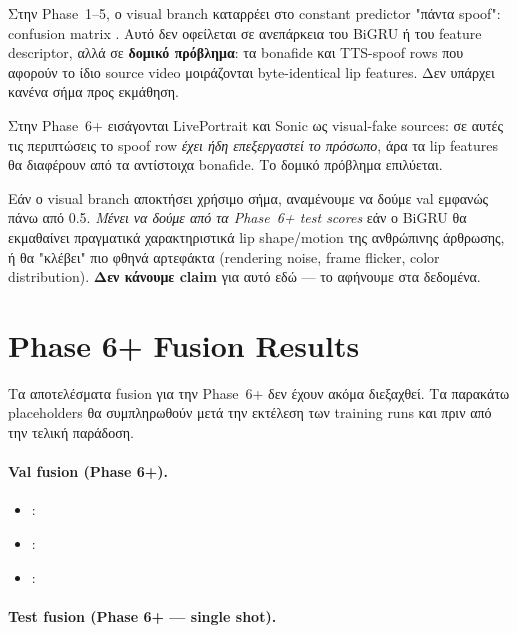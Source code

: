 Στην Phase~1–5, ο visual branch καταρρέει
στο constant predictor "πάντα spoof":
confusion matrix .
Αυτό δεν οφείλεται σε ανεπάρκεια του BiGRU ή του feature descriptor,
αλλά σε \textbf{δομικό πρόβλημα}:
τα bonafide και TTS-spoof rows που αφορούν το ίδιο source video
μοιράζονται byte-identical  lip features.
Δεν υπάρχει κανένα σήμα προς εκμάθηση.

Στην Phase~6+ εισάγονται LivePortrait και Sonic
ως visual-fake sources:
σε αυτές τις περιπτώσεις το spoof row \emph{έχει ήδη επεξεργαστεί το πρόσωπο},
άρα τα lip features θα διαφέρουν από τα αντίστοιχα bonafide.
Το δομικό πρόβλημα επιλύεται.

Εάν ο visual branch αποκτήσει χρήσιμο σήμα,
αναμένουμε να δούμε val \AUC{} εμφανώς πάνω από 0.5.
\emph{Μένει να δούμε από τα Phase~6+ test scores}
εάν ο BiGRU θα εκμαθαίνει πραγματικά χαρακτηριστικά
lip shape/motion της ανθρώπινης άρθρωσης,
ή θα "κλέβει" πιο φθηνά αρτεφάκτα
(rendering noise, frame flicker, color distribution).
\textbf{Δεν κάνουμε claim} για αυτό εδώ —
το αφήνουμε στα δεδομένα.

\section{Phase 6+ Fusion Results}
\label{sec:phase6-fusion-results}

Τα αποτελέσματα fusion για την Phase~6+
δεν έχουν ακόμα διεξαχθεί.
Τα παρακάτω placeholders θα συμπληρωθούν
μετά την εκτέλεση των training runs
και πριν από την τελική παράδοση.

\paragraph{Val \AUC{} fusion (Phase 6+).}

\begin{itemize}
  \item {}: 
  \item {}:    
  \item {}:   
\end{itemize}

\paragraph{Test \AUC{} fusion (Phase 6+ — single shot).}

